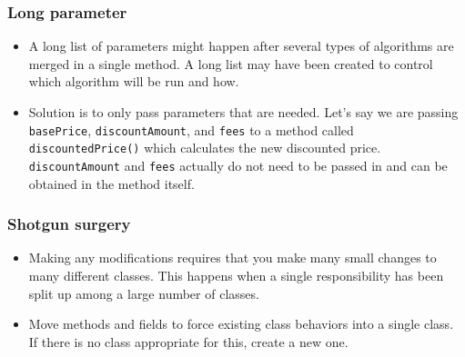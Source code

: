 \documentclass{article}
\begin{document}
\subsubsection{Long parameter}
\begin{itemize}
    \item A long list of parameters might happen after several types of algorithms are merged in a single method. A long list may have been created to control which algorithm will be run and how.
    \item Solution is to only pass parameters that are needed. Let's say we are passing \lstinline{basePrice}, \lstinline{discountAmount}, and \lstinline{fees} to a method called \lstinline{discountedPrice()} which calculates the new discounted price. \lstinline{discountAmount} and \lstinline{fees} actually do not need to be passed in and can be obtained in the method itself.
\end{itemize}

\subsubsection{Shotgun surgery}
\begin{itemize}
    \item Making any modifications requires that you make many small changes to many different classes. This happens when a single responsibility has been split up among a large number of classes.
    \item Move methods and fields to force existing class behaviors into a single class. If there is no class appropriate for this, create a new one.
\end{itemize}
\end{document}
